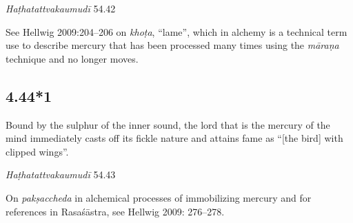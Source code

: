 \begin{ekdosis}
\begin{testimonia}[hp04_044]
\emph{Haṭhatattvakaumudī} 54.42
\begin{versinnote}
\end{versinnote}
\end{testimonia}

\begin{philcomm}[hp04_044]
See Hellwig 2009:204–206 on \emph{khoṭa}, “lame”, which in alchemy is a technical term use to describe mercury that has been processed many times using the \emph{māraṇa} technique and no longer moves.
\end{philcomm}

\subsection*{4.44*1}
\begin{translation}[hp04_044_1]
Bound by the sulphur of the inner sound, the lord that is the mercury of the mind immediately casts off its fickle nature and attains fame as “[the bird] with clipped wings”.
\end{translation} %


\begin{testimonia}[hp04_044_1]
\emph{Haṭhatattvakaumudī} 54.43
\begin{versinnote}
\end{versinnote}
\end{testimonia}

\begin{philcomm}[hp04_044_1]
On \emph{pakṣaccheda} in alchemical processes of immobilizing mercury and for references in Rasaśāstra, see Hellwig 2009: 276–278.




\end{philcomm}
\end{ekdosis}
